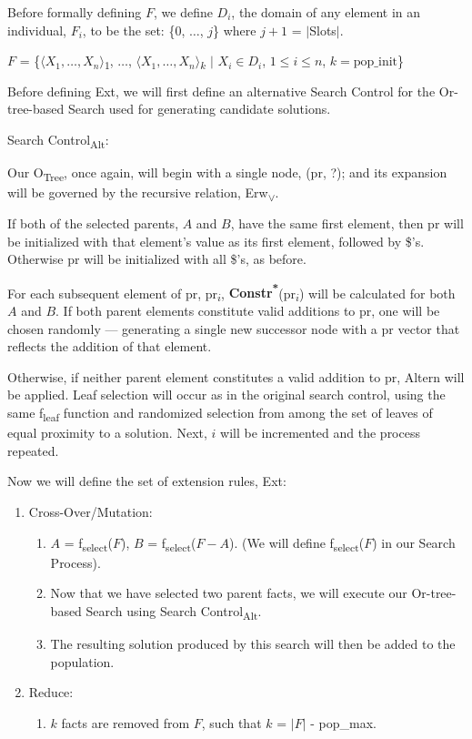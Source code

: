 \documentclass[11pt, oneside]{article}   	%
\begin{document}
\noindent Before formally defining $F$, we define $D_i$, the domain of any element in an individual, $F_i$, to be the set: \{0, $\dots$, $j$\} where $j+1$ = $\vert$Slots$\vert$.

\noindent \centerline{$F$ = \{$\langle X_1, \dots, X_n\rangle$\textsubscript{$1$}, $\dots$, $\langle X_1, \dots, X_n\rangle$\textsubscript{$k$} $\vert$ $X_i \in D_i$, $1 \le i \le n$, $k = \text{pop_init}$\}}

\noindent Before defining Ext, we will first define an alternative Search Control for the Or-tree-based Search used for generating candidate solutions.

\noindent Search Control\textsubscript{Alt}:

\noindent Our O\textsubscript{Tree}, once again, will begin with a single node, (pr, ?); and its expansion will be governed by the recursive relation, Erw\textsubscript{$\lor$}.

\noindent If both of the selected parents, $A$ and $B$, have the same first element, then pr will be initialized with that element's value as its first element, followed by \$'s. Otherwise pr will be initialized with all \$'s, as before.

\noindent For each subsequent element of pr, pr\textsubscript{$i$}, \textbf{Constr\textsuperscript{*}}(pr\textsubscript{$i$}) will be calculated for both $A$ and $B$. If both parent elements constitute valid additions to pr, one will be chosen randomly --- generating a single new successor node with a pr vector that reflects the addition of that element.

\noindent Otherwise, if neither parent element constitutes a valid addition to pr, Altern will be applied. 
Leaf selection will occur as in the original search control, using the same f\textsubscript{leaf} function and randomized selection from among the set of leaves of equal proximity to a solution.
Next, $i$ will be incremented and the process repeated.

\noindent Now we will define the set of extension rules, Ext:
\begin{enumerate} [topsep=0pt, itemsep=0pt, leftmargin=*]
\item Cross-Over/Mutation:
	\begin{enumerate}[leftmargin=*]
	\item $A$ = f\textsubscript{select}($F$), $B$ = f\textsubscript{select}($F - A$). (We will define f\textsubscript{select}($F$) in our Search Process).
	\item Now that we have selected two parent facts, we will execute our Or-tree-based Search using Search Control\textsubscript{Alt}.
	\item The resulting solution produced by this search will then be added to the population.
	\end{enumerate} 
\item Reduce:
	\begin{enumerate}
	\item $k$ facts are removed from $F$, such that $k$ = $\vert F \vert$ - pop_max.
	\end{enumerate}
\end{enumerate}
\end{document}
